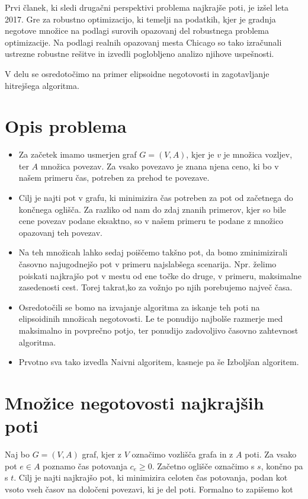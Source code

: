 \documentclass[a4paper, 12 pt]{article}
\theoremstyle{definition} %
\theoremstyle{plain} %
\theoremstyle{definition}
\begin{document}
Prvi članek, ki sledi drugačni perspektivi problema najkrajše poti, je izšel leta 2017. Gre za robustno optimizacijo, ki temelji na podatkih, kjer je gradnja negotove množice na podlagi surovih opazovanj del robustnega problema optimizacije. Na podlagi realnih opazovanj mesta Chicago so tako izračunali ustrezne robustne rešitve in izvedli poglobljeno analizo njihove uspešnosti. \newline

V delu se osredotočimo na primer elipsoidne negotovosti in zagotavljanje hitrejšega algoritma. 


\section{Opis problema}
\begin{itemize}
\item{Za začetek imamo usmerjen graf $ G = (V, A)$, kjer je $v$ je množica vozljev, ter $A$ množica povezav. Za vsako povezavo je znana njena ceno, ki bo v našem primeru čas, potreben za prehod te povezave.}
\item{Cilj je najti pot v grafu, ki minimizira čas potreben za pot od začetnega do končnega oglišča. Za razliko od nam do zdaj znanih primerov, kjer so bile cene povezav podane eksaktno, so v našem primeru te podane z množico opazovanj teh povezav.}
\item{Na teh množicah lahko sedaj poiščemo takšno pot, da bomo zminimizirali časovno najugodnejšo pot v primeru najslabšega scenarija. Npr. želimo poiskati najkrajšo pot v mestu od ene točke do druge, v primeru, maksimalne zasedenosti cest. Torej takrat,ko za vožnjo po njih porebujemo največ časa.}
\item{Osredotočili se bomo na izvajanje algoritma za iskanje teh poti na elipsoidinih množicah negotovosti. Le te ponudijo najbolše razmerje med maksimalno in povprečno potjo, ter ponudijo zadovoljivo časovno zahtevnost algoritma.}
\item{Prvotno sva tako izvedla Naivni algoritem, kasneje pa še Izboljšan algoritem.}
\end{itemize}


\section{Množice negotovosti najkrajših poti}

Naj bo $G = (V, A)$ graf, kjer z $V$ označimo vozlišča grafa in z $A$ poti. Za vsako pot $e\in A$ poznamo čas potovanja $c_{e} \ge 0$. Začetno oglišče označimo s $s$, končno pa s $t$.
Cilj je najti najkrajšo pot, ki minimizira celoten čas potovanja, podan kot vsoto vseh časov na določeni povezavi, ki je del poti. Formalno to zapišemo kot
\end{document}
